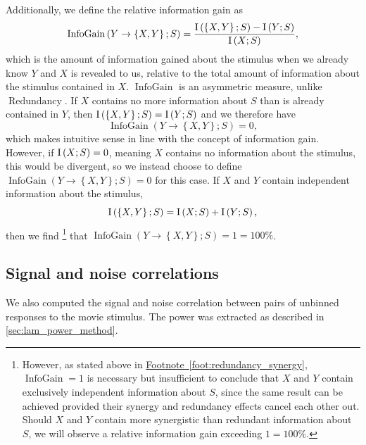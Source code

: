 Additionally, we define the relative information gain as
\begin{equation}
\label{eq:infogain}
\operatorname{InfoGain}\left(Y\to\left\{X,Y\right\};S\right)=\frac{
\operatorname{I}\left(\left\{X,Y\right\};S\right) - \operatorname{I}\left(Y;S\right)
}{
\operatorname{I}\left(X;S\right)
},
\end{equation}
which is the amount of information gained about the stimulus when we already know $Y$ and $X$ is revealed to us, relative to the total amount of information about the stimulus contained in $X$.
$\operatorname{InfoGain}$ is an asymmetric measure, unlike $\operatorname{Redundancy}$.
If $X$ contains no more information about $S$ than is already contained in $Y$, then
$\operatorname{I}\left(\left\{X,Y\right\};S\right) = \operatorname{I}\left(Y;S\right)$
and we therefore have
\begin{equation*}
\operatorname{InfoGain}\left(Y\to\left\{X,Y\right\};S\right)=0,
\end{equation*}
which makes intuitive sense in line with the concept of information gain.
However, if $\operatorname{I}\left(X;S\right)=0$, meaning $X$ contains no information about the stimulus, this would be divergent, so we instead choose to define
$\operatorname{InfoGain}\left(Y\to\left\{X,Y\right\};S\right)=0$
for this case.
If $X$ and $Y$ contain independent information about the stimulus,
\begin{equation*}
\operatorname{I}\left(\left\{X,Y\right\};S\right) = \operatorname{I}\left(X;S\right) + \operatorname{I}\left(Y;S\right),
\end{equation*}
then we find%
\footnote{
However, as stated above in \hyperref[foot:redundancy_synergy]{Footnote~\ref{foot:redundancy_synergy}},
$\operatorname{InfoGain} = 1$
is necessary but insufficient to conclude that $X$ and $Y$ contain exclusively independent information about $S$, since the same result can be achieved provided their synergy and redundancy effects cancel each other out.
Should $X$ and $Y$ contain more synergistic than redundant information about $S$, we will observe a relative information gain exceeding $1 = 100\%$.
}
that
$
\operatorname{InfoGain}\left(Y\to\left\{X,Y\right\};S\right) = 1 = 100\%
$.


\subsection{Signal and noise correlations}

We also computed the signal and noise correlation between pairs of unbinned responses to the movie stimulus.
The power was extracted as described in \autoref{sec:lam_power_method}.

